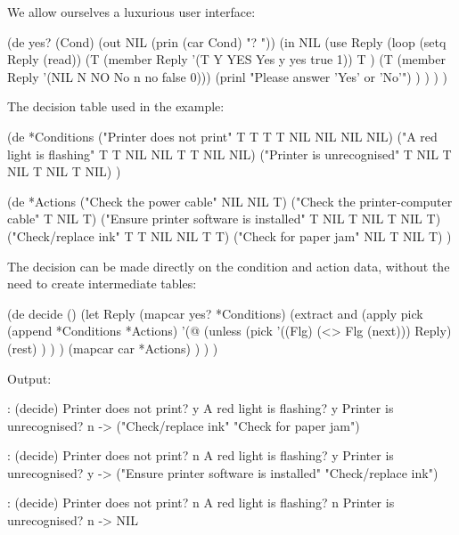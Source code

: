 \begin{wideverbatim}

We allow ourselves a luxurious user interface:

(de yes? (Cond)
   (out NIL (prin (car Cond) "? "))
   (in NIL
      (use Reply
         (loop
            (setq Reply (read))
            (T (member Reply '(T Y YES Yes y yes true 1))
               T )
            (T (member Reply '(NIL N NO No n no false 0)))
            (prinl "Please answer 'Yes' or 'No'") ) ) ) )

The decision table used in the example:

(de *Conditions
   ("Printer does not print"                T   T   T   T  NIL NIL NIL NIL)
   ("A red light is flashing"               T   T  NIL NIL  T   T  NIL NIL)
   ("Printer is unrecognised"               T  NIL  T  NIL  T  NIL  T  NIL) )

(de *Actions
   ("Check the power cable"                NIL NIL  T)
   ("Check the printer-computer cable"      T  NIL  T)
   ("Ensure printer software is installed"  T  NIL  T  NIL  T  NIL  T)
   ("Check/replace ink"                     T   T  NIL NIL  T   T)
   ("Check for paper jam"                  NIL  T  NIL  T) )

The decision can be made directly on the condition and action data, without the
need to create intermediate tables:

(de decide ()
   (let Reply (mapcar yes? *Conditions)
      (extract and
         (apply pick (append *Conditions *Actions)
            '(@
               (unless (pick '((Flg) (<> Flg (next))) Reply)
                  (rest) ) ) )
         (mapcar car *Actions) ) ) )


\end{wideverbatim}

\begin{wideverbatim}

Output:

: (decide)
Printer does not print? y
A red light is flashing? y
Printer is unrecognised? n
-> ("Check/replace ink" "Check for paper jam")

: (decide)
Printer does not print? n
A red light is flashing? y
Printer is unrecognised? y
-> ("Ensure printer software is installed" "Check/replace ink")

: (decide)
Printer does not print? n
A red light is flashing? n
Printer is unrecognised? n
-> NIL

\end{wideverbatim}


